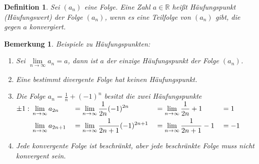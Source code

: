 \documentclass[a4paper,titlepage,oneside]{article}
\def\R{\ensuremath{\mathbb{R}} }
\renewcommand{\liminf}[2][n]{\ensuremath{\lim\limits_{#1 \rightarrow \infty}{#2}}}
\theoremstyle{thmstyle}
\newtheorem{defi}[satz]{Definition}
\newtheorem{bem}[satz]{Bemerkung}
\theoremstyle{subthmstyle}
\begin{document}
\begin{defi}
Sei \((a_n)\) eine Folge. Eine Zahl \(a \in \R\) heißt Häufungspunkt (Häufungswert) der Folge \((a_n)\), wenn es eine Teilfolge von \((a_n)\) gibt, die gegen \(a\) konvergiert.
\end{defi}

\begin{bem}
Beispiele zu Häufungspunkten:
\begin{enumerate}
\item Sei \(\liminf{a_n} = a\), dann ist \(a\) der einzige Häufungspunkt der Folge \((a_n)\).
\item Eine bestimmt divergente Folge hat keinen Häufungspunkt.
\item Die Folge $ \displaystyle a_n = \frac{1}{n}+ (-1)^n $ besitzt die zwei Häufungspunkte $ \displaystyle \pm 1:\\
\begin{aligned}[t] &\liminf{a_{2n}} &&= \liminf{\frac{1}{2n} (-1)^{2n}} &&= \liminf{\frac{1}{2n}} + 1 &&= 1 \\
&\liminf{a_{2n+1}} &&= \liminf{\frac{1}{2n+1} (-1)^{2n+1}} &&= \liminf{\frac{1}{2n+1}} - 1 &&= - 1
\end{aligned}$
\item Jede konvergente Folge ist beschränkt, aber jede beschränkte Folge muss nicht konvergent sein.
\end{enumerate}
\end{bem}
\end{document}
